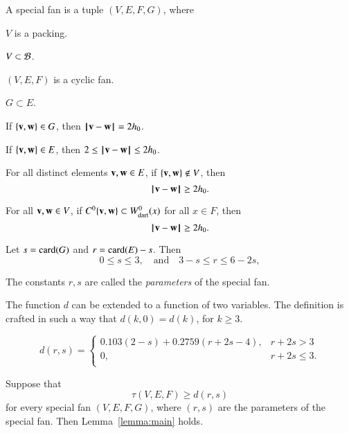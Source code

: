 \begin{definition}
A special fan is a tuple $(V,E,F,G)$, where
\begin{nomerate}
\item {} $V$ is a packing.
\item {} $V\subset {\mathcal B}$.
\item {} $(V,E,F)$ is a cyclic fan.
\item {} $G\subset E$.
\item {} If $\{{\mathbf v},{\mathbf w}\}\in G$, then ${\hskip0.1em|\hskip-0.15em|\hskip0.1em}{\mathbf v} - {\mathbf w}{\hskip0.1em|\hskip-0.15em|\hskip0.1em}=2{h_0}$.
\item {} If $\{{\mathbf v},{\mathbf w}\}\in E$, then $2\le {\hskip0.1em|\hskip-0.15em|\hskip0.1em}{\mathbf v} - {\mathbf w}{\hskip0.1em|\hskip-0.15em|\hskip0.1em}\le 2{h_0}$.
\item {} For all distinct elements ${\mathbf v},{\mathbf w}\in E$, if
$\{{\mathbf v},{\mathbf w}\}\not\in V$, then $${\hskip0.1em|\hskip-0.15em|\hskip0.1em}{\mathbf v} - {\mathbf w}{\hskip0.1em|\hskip-0.15em|\hskip0.1em}\ge 2{h_0}.$$
\item {}  For all ${\mathbf v},{\mathbf w}\in V$, if $C^0\{{\mathbf v},{\mathbf w}\}\subset W^0_{\text{dart}}(x)$ for all $x\in F$, then 
   $${\hskip0.1em|\hskip-0.15em|\hskip0.1em}{\mathbf v} - {\mathbf w}{\hskip0.1em|\hskip-0.15em|\hskip0.1em}\ge 2{h_0}.$$
\item {} %
 Let      $s={\operatorname{card}}(G)$ and $r={\operatorname{card}}(E) - s$.  Then
$$0\le s \le 3,\quad\text{and}\quad3-s \le r \le 6 - 2s,$$
\end{nomerate}
The constants $r,s$ are called the {\it parameters} of the special fan.
\end{definition}


The function $d$ can be extended to a function of two variables.  The definition is crafted in such a way that $d(k,0) = d(k)$, for $k\ge 3$.

\begin{definition}[d]
$$d(r,s) = \begin{cases}
    0.103 (2-s) + 0.2759 (r+2s-4), & r + 2s > 3\\
    0, & r + 2s \le 3.\\
    \end{cases}$$
\end{definition}


\begin{lemma}
Suppose that
$$
\tau(V,E,F) \ge d (r,s)
$$
for every special fan $(V,E,F,G)$,
where $(r,s)$ are the parameters of the special fan.
Then Lemma~\ref{lemma:main} holds.
\end{lemma}

